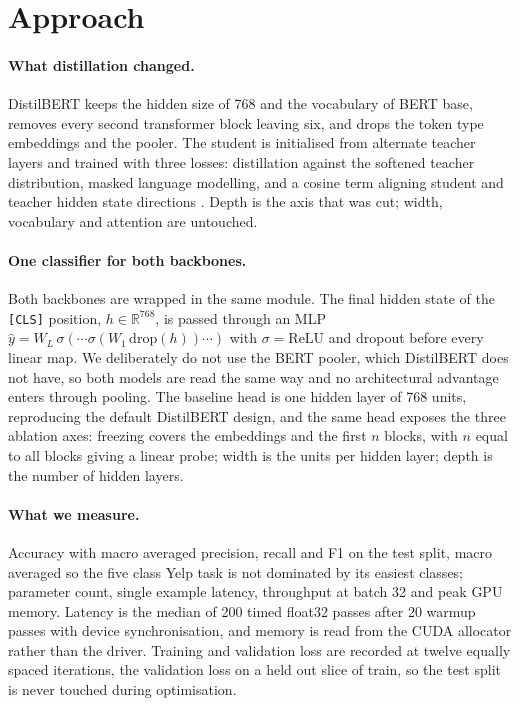 \documentclass{article}
\begin{document}
\section{Approach}

\paragraph{What distillation changed.}
DistilBERT keeps the hidden size of 768 and the vocabulary of BERT base, removes every second transformer
block leaving six, and drops the token type embeddings and the pooler. The student is initialised from
alternate teacher layers and trained with three losses: distillation against the softened teacher
distribution, masked language modelling, and a cosine term aligning student and teacher hidden state
directions \citep{sanh2019distilbert}. Depth is the axis that was cut; width, vocabulary and attention are
untouched.

\paragraph{One classifier for both backbones.}
Both backbones are wrapped in the same module. The final hidden state of the \texttt{[CLS]} position,
$h \in \mathbb{R}^{768}$, is passed through an MLP $\hat{y} = W_L\,\sigma(\cdots \sigma(W_1\,
\mathrm{drop}(h)) \cdots)$ with $\sigma = \mathrm{ReLU}$ and dropout before every linear map. We
deliberately do not use the BERT pooler, which DistilBERT does not have, so both models are read the same
way and no architectural advantage enters through pooling. The baseline head is one hidden layer of 768
units, reproducing the default DistilBERT design, and the same head exposes the three ablation axes:
freezing covers the embeddings and the first $n$ blocks, with $n$ equal to all blocks giving a linear
probe; width is the units per hidden layer; depth is the number of hidden layers.

\paragraph{What we measure.}
Accuracy with macro averaged precision, recall and F1 on the test split, macro averaged so the five class
Yelp task is not dominated by its easiest classes; parameter count, single example latency, throughput at
batch 32 and peak GPU memory. Latency is the median of 200 timed float32 passes after 20 warmup passes with
device synchronisation, and memory is read from the CUDA allocator rather than the driver. Training and
validation loss are recorded at twelve equally spaced iterations, the validation loss on a held out slice
of train, so the test split is never touched during optimisation.
\end{document}
